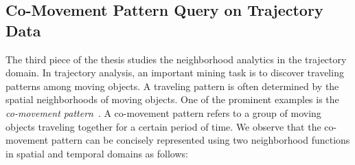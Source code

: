 \subsection{Co-Movement Pattern Query on Trajectory Data}
The third piece of the thesis studies the neighborhood
analytics in the trajectory domain. 
In trajectory analysis, an important
mining task is to discover traveling patterns among moving objects. 
A traveling pattern is often determined by the spatial neighborhoods of moving objects. One of the prominent examples is the \emph{co-movement pattern}~\cite{li2013onlinegroup,zheng2015trajectory}.
A co-movement pattern refers to a group of moving objects traveling together for a certain period of time. 
We observe that the co-movement pattern can be concisely represented using two neighborhood functions in spatial and temporal domains as follows:

